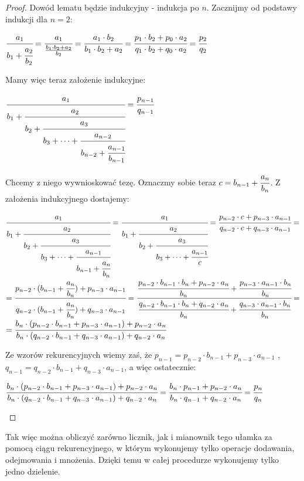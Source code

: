 \documentclass[a4paper]{article}
\begin{document}
\begin{proof}
Dowód lematu będzie indukcyjny - indukcja po $n$. Zacznijmy od podstawy indukcji dla $n = 2$:
\begin{center}
$\cfrac {a_1}{b_1 + {\cfrac {a_2}{b_2}}} = \cfrac {a_1}{\frac {b_1 \cdot b_2 + a_2}{b_2}} = \cfrac {a_1 \cdot b_2}{b_1 \cdot b_2 + a_2} = \cfrac {p_1 \cdot b_2 + p_0 \cdot a_2}{q_1 \cdot b_2 + q_0 \cdot a_2} = \cfrac{p_2}{q_2}$
\end{center}
Mamy więc teraz założenie indukcyjne:
\begin{center}
$\cfrac {a_1}{b_1 + {\cfrac {a_2}{b_2+{\cfrac {a_3}{b_3 + \cdots +\cfrac  {a_{n-2}}{b_{n-2} + \cfrac {a_{n-1}}{b_{n-1}}}}}}}} = \cfrac{p_{n-1}}{q_{n-1}}$
\end{center}
Chcemy z niego wywnioskować tezę. Oznaczmy sobie teraz $c = b_{n-1} + \cfrac{a_n}{b_n}$. Z założenia indukcyjnego dostajemy:
\begin{center}
$\cfrac {a_1}{b_1 + {\cfrac {a_2}{b_2+{\cfrac {a_3}{b_3 + \cdots +\cfrac  {a_{n-1}}{b_{n-1} + \cfrac {a_n}{b_n}}}}}}} = \cfrac {a_1}{b_1 + {\cfrac {a_2}{b_2+{\cfrac {a_3}{b_3 + \cdots +\cfrac  {a_{n-1}}{c}}}}}} = \cfrac {p_{n-2} \cdot c + p_{n-3} \cdot a_{n-1}}{q_{n-2} \cdot c + q_{n-3} \cdot a_{n-1}} =$ $= \cfrac {p_{n-2} \cdot (b_{n-1} + \cfrac{a_n}{b_n}) + p_{n-3} \cdot a_{n-1}}{q_{n-2} \cdot (b_{n-1} + \cfrac{a_n}{b_n}) + q_{n-3} \cdot a_{n-1}} = \cfrac {\cfrac{p_{n-2} \cdot b_{n-1} \cdot b_n + p_{n-2} \cdot a_n}{b_n} + \cfrac{p_{n-3} \cdot a_{n-1} \cdot b_n}{b_n}}{\cfrac{q_{n-2} \cdot b_{n-1} \cdot b_n + q_{n-2} \cdot a_n}{b_n} + \cfrac{q_{n-3} \cdot a_{n-1} \cdot b_n}{b_n}} =$\\ $ = \cfrac {b_n \cdot (p_{n-2} \cdot b_{n-1} + p_{n-3} \cdot a_{n-1}) + p_{n-2} \cdot a_n}{b_n \cdot (q_{n-2} \cdot b_{n-1} + q_{n-3} \cdot a_{n-1}) + q_{n-2} \cdot a_n}$
\end{center}
Ze wzorów rekurencyjnych wiemy zaś, że $p_{n-1} = p_{n-2} \cdot b_{n-1} + p_{n-3} \cdot a_{n-1}$ , $q_{n-1} = q_{n-2} \cdot b_{n-1} + q_{n-3} \cdot a_{n-1}$, a więc ostatecznie:
\begin{center}
$\cfrac {b_n \cdot (p_{n-2} \cdot b_{n-1} + p_{n-3} \cdot a_{n-1}) + p_{n-2} \cdot a_n}{b_n \cdot (q_{n-2} \cdot b_{n-1} + q_{n-3} \cdot a_{n-1}) + q_{n-2} \cdot a_n} = \cfrac {b_n \cdot p_{n-1} + p_{n-2} \cdot a_n}{b_n \cdot q_{n-1} + q_{n-2} \cdot a_n} = \cfrac{p_n}{q_n}$
\end{center}
\end{proof}
Tak więc można obliczyć zarówno licznik, jak i mianownik tego ułamka za pomocą ciągu rekurencyjnego, w którym wykonujemy tylko operacje dodawania, odejmowania i mnożenia. Dzięki temu w całej procedurze wykonujemy tylko jedno dzielenie.\\
\end{document}
